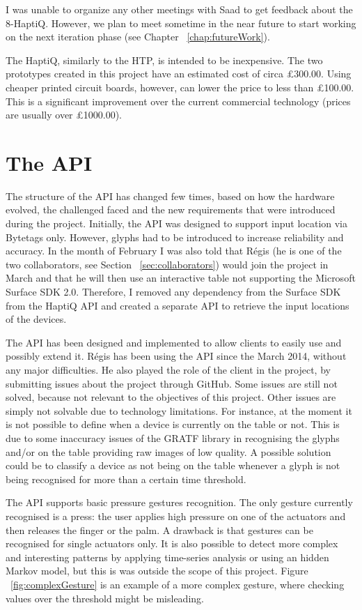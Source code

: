 I was unable to organize any other meetings with Saad to get feedback about the 8-HaptiQ. However, we plan to meet sometime in the near future to start working on the next iteration phase (see Chapter ~\ref{chap:futureWork}). 

The HaptiQ, similarly to the HTP, is intended to be inexpensive. The two prototypes created in this project have an estimated cost of circa £300.00. Using cheaper printed circuit boards, however, can lower the price to less than £100.00. This is a significant improvement over the current commercial technology (prices are usually over £1000.00).

\section{The API}

The structure of the API has changed few times, based on how the hardware evolved, the challenged faced and the new requirements that were introduced during the project. 
Initially, the API was designed to support input location via Bytetags only. However, glyphs had to be introduced to increase reliability and accuracy. In the month of February I was also told that Régis (he is one of the two collaborators, see Section ~\ref{sec:collaborators}) would join the project in March and that he will then use an interactive table not supporting the Microsoft Surface SDK 2.0. Therefore, I removed any dependency from the Surface SDK from the HaptiQ API and created a separate API to retrieve the input locations of the devices. 

The API has been designed and implemented to allow clients to easily use and possibly extend it. Régis has been using the API since the  March 2014, without any major difficulties. He also played the role of the client in the project, by submitting issues about the project through GitHub. Some issues are still not solved, because not relevant to the objectives of this project. Other issues are simply not solvable due to technology limitations. For instance, at the moment it is not possible to define when a device is currently on the table or not. This is due to some inaccuracy issues of the GRATF library in recognising the glyphs and/or on the table providing raw images of low quality. A possible solution could be to classify a device as not being on the table whenever a glyph is not being recognised for more than a certain time threshold. 

The API supports basic pressure gestures recognition. The only gesture currently recognised is a press: the user applies high pressure on one of the actuators and then releases the finger or the palm. A drawback is that gestures can be recognised for single actuators only. It is also possible to detect more complex and interesting patterns by applying time-series analysis or using an hidden Markov model, but this is was outside the scope of this project. Figure ~\ref{fig:complexGesture} is an example of a more complex gesture, where checking values over the threshold might be misleading.

